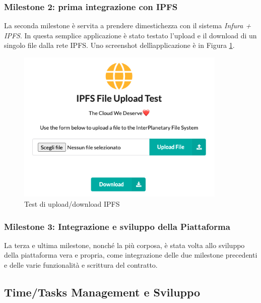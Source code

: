 \documentclass{article}
\begin{document}
\subsubsection{Milestone 2: prima integrazione con IPFS}
La seconda milestone è servita a prendere dimestichezza con il sistema \textit{Infura + IPFS}. In questa semplice applicazione è stato testato l'upload e il download di un singolo file dalla rete IPFS. Uno screenshot dellìapplicazione è in Figura \ref{fig:ipfs}.
\begin{figure}[!ht]
  \includegraphics[width=10cm]{images/ipfs.png}
  \centering
  \caption{Test di upload/download IPFS}
  \label{fig:ipfs}
\end{figure}

\subsubsection{Milestone 3: Integrazione e sviluppo della Piattaforma}
La terza e ultima milestone, nonché la più corposa, è stata volta allo sviluppo della piattaforma vera e propria, come integrazione delle due milestone precedenti e delle varie funzionalità e scrittura del contratto.

\subsection{Time/Tasks Management e Sviluppo}
\end{document}
